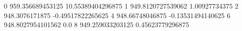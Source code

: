 0 959.356689453125 10.55389404296875
1 949.8120727539062 1.00927734375
2 948.3076171875 -0.49517822265625
4 948.66748046875 -0.13531494140625
6 948.8027954101562 0.0
8 949.259033203125 0.45623779296875

